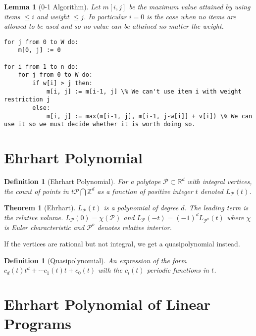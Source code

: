 \documentclass[11pt]{book}
\theoremstyle{change}
\newtheorem{definition}[equation]{Definition}
\newtheorem{theorem}[equation]{Theorem}
\newtheorem{lemma}[equation]{Lemma}
\theoremstyle{nonumberplain}
\numberwithin{equation}{section}
\begin{document}
\begin{lemma}[0-1 Algorithm]

Let $m[i,j]$ be the maximum value attained by using items $\leq i$ and weight $\leq j$. In particular $i=0$ is the case when no items are allowed to be used and so no value can be attained no matter the weight.

\begin{lstlisting}[label=KnapsackDynamicProgramming,caption=KnapsackDynamicProgramming]
for j from 0 to W do:
    m[0, j] := 0

for i from 1 to n do:
    for j from 0 to W do:
        if w[i] > j then:
            m[i, j] := m[i-1, j] \% We can't use item i with weight restriction j
        else:
            m[i, j] := max(m[i-1, j], m[i-1, j-w[i]] + v[i]) \% We can use it so we must decide whether it is worth doing so.
\end{lstlisting}
\end{lemma}

\section{Ehrhart Polynomial}

\begin{definition}[Ehrhart Polynomial]
For a polytope $\mathcal{P} \subset \mathbb{R}^d$ with integral vertices, the count of points in $t\mathcal{P} \bigcap \mathbb{Z}^d$ as a function of positive integer $t$ denoted $L_\mathcal{P} (t)$.
\end{definition}

\begin{theorem}[Ehrhart]
$L_{\mathcal{P}} (t)$ is a polynomial of degree $d$. The leading term is the relative volume. $L_\mathcal{P} (0) = \chi (\mathcal{P})$ and $L_{\mathcal{P}} (-t) = (-1)^d L_{\mathcal{P}^o} (t)$ where $\chi$ is Euler characteristic and $\mathcal{P}^o$ denotes relative interior.
\end{theorem}

If the vertices are rational but not integral, we get a quasipolynomial instead.

\begin{definition}[Quasipolynomial]
An expression of the form $c_d (t) t^d + \cdots c_1 (t) t + c_0 (t)$ with the $c_i (t)$ periodic functions in $t$.
\end{definition}

\section{Ehrhart Polynomial of Linear Programs}
\end{document}
